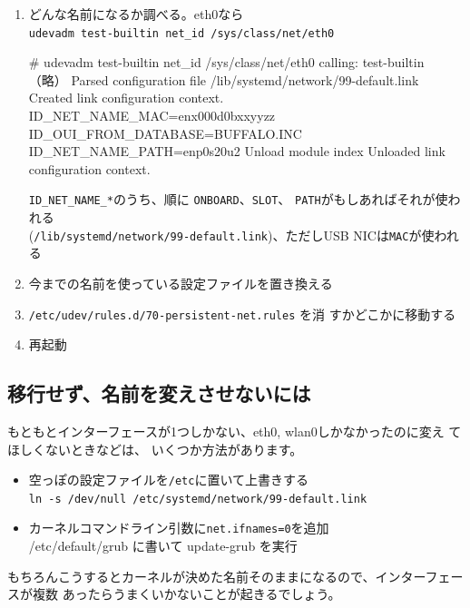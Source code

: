 \documentclass[mingoth,a4paper]{jsarticle}
\begin{document}
 \begin{enumerate}%
  \item どんな名前になるか調べる。eth0なら\\
	\texttt{udevadm test-builtin net\_id /sys/class/net/eth0}
\begin{commandline}
# udevadm test-builtin net_id /sys/class/net/eth0
calling: test-builtin
（略）
Parsed configuration file /lib/systemd/network/99-default.link
Created link configuration context.
ID_NET_NAME_MAC=enx000d0bxxyyzz
ID_OUI_FROM_DATABASE=BUFFALO.INC
ID_NET_NAME_PATH=enp0s20u2
Unload module index
Unloaded link configuration context.
\end{commandline}
	\texttt{ID\_NET\_NAME\_*}のうち、順に
	\texttt{ONBOARD}、\texttt{SLOT}、
	\texttt{PATH}がもしあればそれが使われる\\
(\texttt{/lib/systemd/network/99-default.link})、ただしUSB NICは\texttt{MAC}が使われる
  \item 今までの名前を使っている設定ファイルを置き換える
  \item \texttt{/etc/udev/rules.d/70-persistent-net.rules} を消
	すかどこかに移動する
  \item 再起動
 \end{enumerate}


\subsection[containsverbatim]{移行せず、名前を変えさせないには}
 もともとインターフェースが1つしかない、eth0, wlan0しかなかったのに変え
 てほしくないときなどは、
 いくつか方法があります。
\begin{itemize}
 \item 空っぽの設定ファイルを\texttt{/etc}に置いて上書きする\\
       \verb|ln -s /dev/null /etc/systemd/network/99-default.link|
 \item カーネルコマンドライン引数に\texttt{net.ifnames=0}を追加\\
       /etc/default/grub に書いて update-grub を実行
\end{itemize}

 もちろんこうするとカーネルが決めた名前そのままになるので、インターフェースが複数
 あったらうまくいかないことが起きるでしょう。
\end{document}
